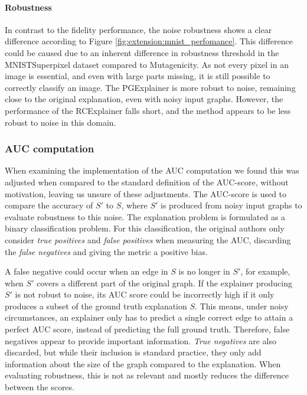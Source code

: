 \paragraph{Robustness}
In contrast to the fidelity performance, the noise robustness shows a clear difference according to Figure \ref{fig:extension:mnist_perfomance}. This difference could be caused due to an inherent difference in robustness threshold in the MNISTSuperpixel dataset compared to Mutagenicity. As not every pixel in an image is essential, and even with large parts missing, it is still possible to correctly classify an image. The PGExplainer is more robust to noise, remaining close to the original explanation, even with noisy input graphs. However, the performance of the RCExplainer falls short, and the method appears to be less robust to noise in this domain.

\subsubsection{AUC computation} \label{subsec:auc}
When examining the implementation of the AUC computation we found this was adjusted when compared to the standard definition of the AUC-score, without motivation, leaving us unsure of these adjustments. The AUC-score is used to compare the accuracy of $S'$ to $S$, where $S'$ is produced from noisy input graphs to evaluate robustness to this noise. The explanation problem is formulated as a binary classification problem. For this classification, the original authors only consider \textit{true positives} and \textit{false positives} when measuring the AUC, discarding the \textit{false negatives} and giving the metric a positive bias. 

A false negative could occur when an edge in $S$ is no longer in $S'$, for example, when $S'$ covers a different part of the original graph. If the explainer producing $S'$ is not robust to noise, its AUC score could be incorrectly high if it only produces a subset of the ground truth explanation $S$. This means, under noisy circumstances, an explainer only has to predict a single correct edge to attain a perfect AUC score, instead of predicting the full ground truth. Therefore, false negatives appear to provide important information. \textit{True negatives} are also discarded, but while their inclusion is standard practice, they only add information about the size of the graph compared to the explanation. When evaluating robustness, this is not as relevant and mostly reduces the difference between the scores. 

